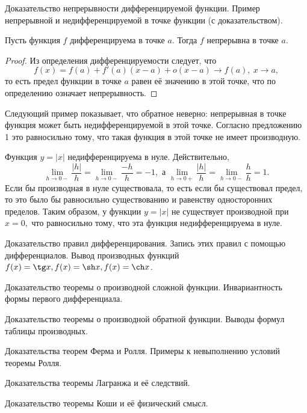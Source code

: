 \newpage

\begin{problem}
Доказательство непрерывности дифференцируемой функции. Пример непрерывной и недифференцируемой в точке функции (с доказательством).
\end{problem}

\begin{proposition}
    Пусть функция $f$ дифференцируема
    в точке $a.$ Тогда $f$ непрерывна в точке $a.$
\end{proposition}
\begin{proof}
    Из определения дифференцируемости следует, что
    $$
        f(x)=f(a)+f'(a)(x-a)+o(x-a)\rightarrow f(a), \
        x\rightarrow a,
    $$
    то есть предел функции в точке $a$ равен
    её значению в этой точке, что по определению
    означает непрерывность.
\end{proof}
Следующий пример показывает, что обратное
неверно: непрерывная в точке функция может
быть недифференцируемой в этой точке.
Согласно предложению 1 это равносильно
тому, что такая функция в этой точке не имеет производную.
\begin{example}
    Функция $y=|x|$ недифференцируема в нуле.
    Действительно,
    $$
        \lim\limits_{h\to 0-}
        \frac{|h|}{h}=\lim\limits_{h\to 0-}
        \frac{-h}{h}=-1, \textrm{ а }
        \lim\limits_{h\to 0+}
        \frac{|h|}{h}=
        \lim\limits_{h\to 0-}
        \frac{h}{h}=1.
    $$
    Если бы производная
    в нуле существовала, то есть если бы
    существовал предел, то это было бы равносильно
    существованию и равенству односторонних пределов.
    Таким образом, у функции $y=|x|$
    не существует производной при $x=0,$ что равносильно
    тому, что эта функция недифференцируема в нуле.
\end{example}

\newpage

\begin{problem}
Доказательство правил дифференцирования. Запись этих правил с помощью дифференциалов. Вывод производных функций $f(x) = \tg x, f(x) = \sh x, f(x) = \ch x$.
\end{problem}
\newpage

\begin{problem}
Доказательство теоремы о производной сложной функции. Инвариантность формы
первого дифференциала.
\end{problem}
\newpage

\begin{problem}
Доказательство теоремы о производной обратной функции. Выводы формул таблицы
производных.
\end{problem}
\newpage

\begin{problem}
Доказательства теорем Ферма и Ролля. Примеры к невыполнению условий теоремы
Ролля.
\end{problem}
\newpage

\begin{problem}
Доказательства теоремы Лагранжа и её следствий.
\end{problem}
\newpage

\begin{problem}
Доказательство теоремы Коши и её физический смысл.
\end{problem}
\newpage
